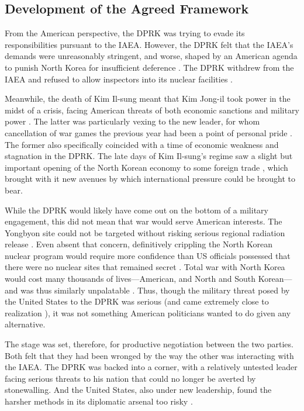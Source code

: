 \subsection{Development of the Agreed Framework}

From the American perspective, the DPRK was trying to evade its responsibilities pursuant to the IAEA. However, the DPRK felt that the IAEA's demands were unreasonably stringent, and worse, shaped by an American agenda to punish North Korea for insufficient deference \cite{cumings}. The DPRK withdrew from the IAEA and refused to allow inspectors into its nuclear facilities \cite{iaea09}.

Meanwhile, the death of Kim Il-sung meant that Kim Jong-il took power in the midst of a crisis, facing American threats of both economic sanctions and military power \cite{jun,cerami,cnn99}. The latter was particularly vexing to the new leader, for whom cancellation of war games the previous year had been a point of personal pride \cite{farrell}. The former also specifically coincided with a time of economic weakness and stagnation in the DPRK. The late days of Kim Il-sung's regime saw a slight but important opening of the North Korean economy to some foreign trade \cite{sigal}, which brought with it new avenues by which international pressure could be brought to bear.

While the DPRK would likely have come out on the bottom of a military engagement, this did not mean that war would serve American interests. The Yongbyon site could not be targeted without risking serious regional radiation release \cite{beal}. Even absent that concern, definitively crippling the North Korean nuclear program would require more confidence than US officials possessed that there were no nuclear sites that remained secret \cite{sigal}. Total war with North Korea would cost many thousands of lives---American, and North and South Korean---and was thus similarly unpalatable \cite{cumings}. Thus, though the military threat posed by the United States to the DPRK was serious (and came extremely close to realization \cite{cnn99}), it was not something American politicians wanted to do given any alternative.
	
The stage was set, therefore, for productive negotiation between the two parties. Both felt that they had been wronged by the way the other was interacting with the IAEA. The DPRK was backed into a corner, with a relatively untested leader facing serious threats to his nation that could no longer be averted by stonewalling. And the United States, also under new leadership, found the harsher methods in its diplomatic arsenal too risky \cite{hecker2}.

